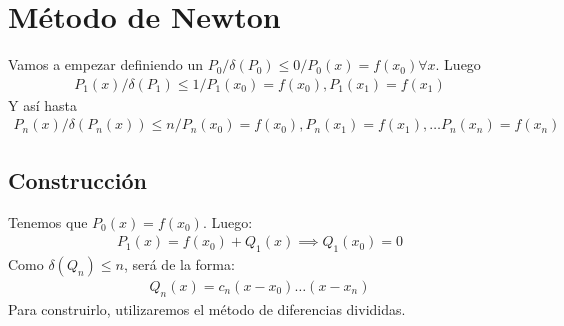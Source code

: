 \documentclass{article}
\begin{document}
\section{Método de Newton}
Vamos a empezar definiendo un $P_{0} / \delta (P_{0}) \leq 0 / P_{0}(x)= f(x_{0}) \forall x$. Luego
\begin{equation}
	\begin{split}
		P_{1}(x) / \delta(P_{1}) \leq 1 / P_{1}(x_{0})=f(x_{0}), P_{1}(x_{1})= f(x_{1})
	\end{split}
\end{equation}
Y así hasta
\begin{equation}
	\begin{split}
		P_{n}(x) / \delta(P_{n}(x)) \leq n / P_{n}(x_{0}) = f(x_{0}),P_{n}(x_{1})=f(x_{1}),\dots P_{n}(x_{n})=f(x_{n})
	\end{split}
\end{equation}
\subsection{Construcción}
Tenemos que $P_{0}(x)=f(x_{0})$. Luego:
\begin{equation}
	\begin{split}
		P_{1}(x)=f(x_{0})+Q_{1}(x) \implies
		Q_{1}(x_{0})=0
	\end{split}
\end{equation}
Como $\delta(Q_{n}) \leq n$, será de la forma:
\begin{equation}
	\begin{split}
		Q_{n}(x)=c_{n}(x-x_{0})\dots (x-x_{n})
	\end{split}
\end{equation}
Para construirlo, utilizaremos el método de diferencias
divididas.
\end{document}
